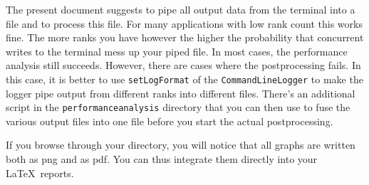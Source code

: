\begin{remark}
The present document suggests to pipe all output data from the terminal into a
file and to process this file. 
For many applications with low rank count this works fine.
The more ranks you have however the higher the probability that concurrent
writes to the terminal mess up your piped file.
In most cases, the performance analysis still succeeds. 
However, there are cases where the postprocessing fails.
In this case, it is better to use \texttt{setLogFormat} of the
\texttt{CommandLineLogger} to make the logger pipe output from different ranks
into different files.
There's an additional script in the \texttt{performanceanalysis} directory that
you can then use to fuse the various output files into one file before you start
the actual postprocessing.
\end{remark}



\noindent
If you browse through your directory, you will notice that all graphs are
written both as png and as pdf. 
You can thus integrate them directly into your \LaTeX\ reports.
